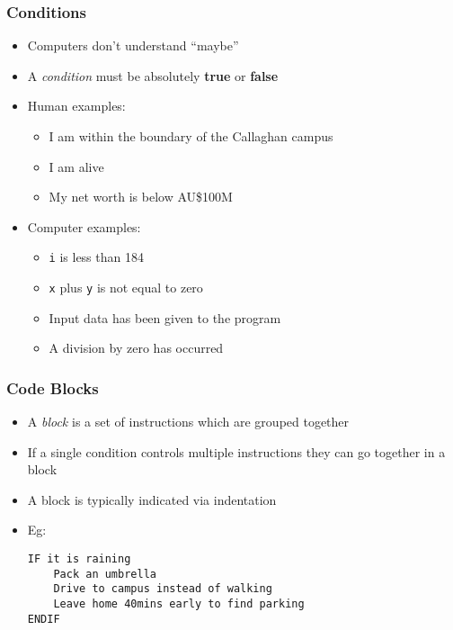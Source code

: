 \documentclass[14pt]{beamer}
\begin{document}
\begin{frame}
\frametitle{Conditions}
\begin{itemize}
\item Computers don't understand ``maybe''
\item A \textit{condition} must be absolutely \textbf{true} or \textbf{false}
\item Human examples:
	\begin{itemize}
		\item I am within the boundary of the Callaghan campus
		\item I am alive
		\item My net worth is below AU\$100M
	\end{itemize}
\item Computer examples:
	\begin{itemize}
		\item \texttt{i} is less than 184
		\item \texttt{x} plus \texttt{y} is not equal to zero
		\item Input data has been given to the program
		\item A division by zero has occurred
	\end{itemize}
\end{itemize}
\end{frame}

\begin{frame}[fragile]
\frametitle{Code Blocks}
\begin{itemize}
\item A \textit{block} is a set of instructions which are grouped together
\item If a single condition controls multiple instructions they can go together in a block
\item A block is typically indicated via indentation
\item Eg:
\begin{lstlisting}[style=pseudo]
IF it is raining
	Pack an umbrella
	Drive to campus instead of walking
	Leave home 40mins early to find parking
ENDIF
\end{lstlisting}
\end{itemize}
\end{frame}
\end{document}
